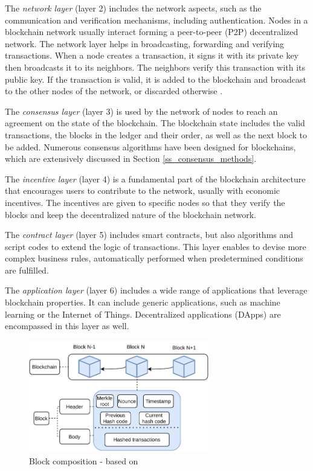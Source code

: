 The \emph{network layer} (layer 2) includes the network aspects, such as the communication and verification mechanisms, including authentication. Nodes in a blockchain network usually interact forming a peer-to-peer (P2P) decentralized network. The network layer helps in broadcasting, forwarding and verifying transactions.  When a node creates a transaction, it signs it with its private key then broadcasts it to its neighbors. The neighbors verify this transaction with its public key. If the transaction is valid, it is added to the blockchain and broadcast to the other nodes of the network, or discarded otherwise \cite{Yuan2018, Issa2023}.

The \emph{consensus layer} (layer 3) is used by the network of nodes to reach an agreement on the state of the blockchain. The blockchain state includes the valid transactions, the blocks in the ledger and their order, as well as the next block to be added. Numerous consensus algorithms have been designed for blockchains, which are extensively discussed in Section \ref{ss_consensus_methods}.

The \emph{incentive layer} (layer 4) is a fundamental part of the blockchain architecture that encourages users to contribute to the network, usually with economic incentives.
The incentives are given to specific nodes so that they verify the blocks and keep the decentralized nature of the blockchain network. 

The \emph{contract layer} (layer 5) includes smart contracts, but also algorithms and script codes to extend the logic of transactions. This layer enables to devise more complex business rules, automatically performed when predetermined conditions are fulfilled.

The \emph{application layer} (layer 6) includes a wide range of applications that leverage blockchain properties. It can include generic applications, such as machine learning or the Internet of Things. Decentralized applications (DApps) are encompassed in this layer as well.

\begin{figure}[t]
\centering
 \includegraphics[width=0.7\textwidth]{Images/blockstruct.pdf}
\caption{Block composition - based on \cite{Issa2023}} 
\label{F_blockstruct}
\end{figure}

